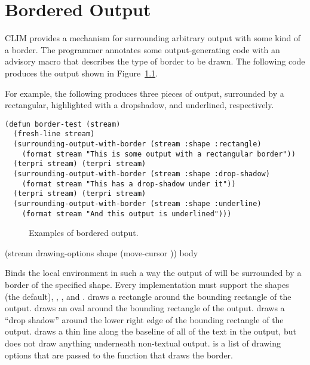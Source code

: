 
\chapter {Bordered Output}
\label {bordered-output}

CLIM provides a mechanism for surrounding arbitrary output with some kind of a
border.  The programmer annotates some output-generating code with an advisory
macro that describes the type of border to be drawn.  The following code
produces the output shown in Figure~\ref{border-example}.

For example, the following produces three pieces of output, surrounded by a
rectangular, highlighted with a dropshadow, and underlined, respectively.

\begin{verbatim}
(defun border-test (stream)
  (fresh-line stream)
  (surrounding-output-with-border (stream :shape :rectangle)
    (format stream "This is some output with a rectangular border"))
  (terpri stream) (terpri stream)
  (surrounding-output-with-border (stream :shape :drop-shadow)
    (format stream "This has a drop-shadow under it"))
  (terpri stream) (terpri stream)
  (surrounding-output-with-border (stream :shape :underline)
    (format stream "And this output is underlined")))
\end{verbatim}

\begin{figure}
\centerline{}
\caption{\label{border-example} Examples of bordered output.}
\end{figure}


 {(\optional stream
                                             \rest drawing-options
                                             \key shape (move-cursor ))
                                            \body body}

Binds the local environment in such a way the output of  will be
surrounded by a border of the specified shape.  Every implementation must
support the shapes  (the default), , ,
and .   draws a rectangle around the bounding
rectangle of the output.   draws an oval around the bounding rectangle
of the output.   draws a ``drop shadow'' around the lower right
edge of the bounding rectangle of the output.   draws a thin line
along the baseline of all of the text in the output, but does not draw anything
underneath non-textual output.   is a list of drawing
options that are passed to the function that draws the border.

